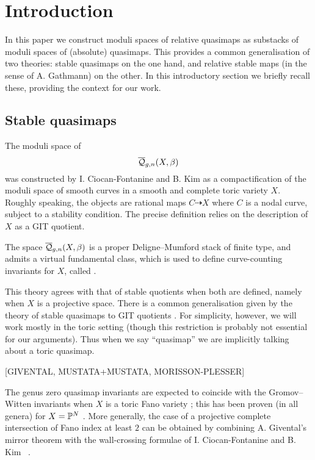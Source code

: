 \section{Introduction}
In this paper we construct moduli spaces of relative quasimaps as substacks of moduli spaces of (absolute) quasimaps. This provides a common generalisation of two theories: stable quasimaps on the one hand, and relative stable maps (in the sense of A. Gathmann) on the other. In this introductory section we briefly recall these, providing the context for our work.

\subsection{Stable quasimaps}
The moduli space of 
\begin{equation*}\overline{\mathcal Q}_{g,n}(X,\beta)\end{equation*}
was constructed by I. Ciocan-Fontanine and B. Kim \cite{CF-K} as a compactification of the moduli space of smooth curves in a smooth and complete toric variety $X$. Roughly speaking, the objects are rational maps $C \dashrightarrow X$ where $C$ is a nodal curve, subject to a stability condition. The precise definition relies on the description of $X$ as a GIT quotient.

The space $\overline{\mathcal Q}_{g,n}(X,\beta)$ is a proper Deligne--Mumford stack of finite type, and admits a virtual fundamental class, which is used to define curve-counting invariants for $X$, called .

This theory agrees with that of stable quotients \cite{MOP} when both are defined, namely when $X$ is a projective space.  There is a common generalisation given by the theory of stable quasimaps to GIT quotients \cite{CFKM}. For simplicity, however, we will work mostly in the toric setting (though this restriction is probably not essential for our arguments). Thus when we say ``quasimap'' we are implicitly talking about a toric quasimap.

[GIVENTAL, MUSTATA+MUSTATA, MORISSON-PLESSER]

The genus zero quasimap invariants are expected to coincide with the Gromov--Witten invariants when $X$ is a toric Fano variety \cite{CM}; this has been proven (in all genera) for $X=\mathbb P^N$ \cite[Theorem 3]{MOP} \cite[\S 5.4]{Manolache-Push}. More generally, the case of a projective complete intersection of Fano index at least $2$ can be obtained by combining A. Givental's mirror theorem \cite[Theorem 0.1]{Givental-mirror} with the wall-crossing formulae of I. Ciocan-Fontanine and B. Kim \cite[Conjecture 7.2.10]{CF-K}\  \cite[\S 5.5 and Conjecture 6.3.1]{CF-K-wallcrossing}.

